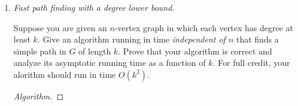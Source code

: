 \documentclass[11pt]{article}
\newcounter{totalpoints}
\newcommand{\points}[1]{\addtocounter{totalpoints}{#1}{[#1 point\ifthenelse{\equal{#1}{1}}{}{s}]}}
\begin{document}
\begin{enumerate}[leftmargin=*,start=0]
\begin{proof}[Solution]
First, since there are 4 students, there are only 3 possible ways to make 2 pairs. 

1) Suppose A and B are paired. Therefore, C and D are paired. However, B would rather be with C than A and 
C would rather be with B than D.

2) Suppose A and C are paired. Therefore, B and D are paired. However, A would rather be with B than C and
B would rather be with A than D.

3) Suppose A and D are paired. Therefore, B and C are paired. However, A would rather be with C than 
D and C would rather be with A than B. 

Therefore, no stable matching exists for this instance with $n=2$.
\end{proof}
\newpage

\item \emph{Fast path finding with a degree lower bound.} \points{20}

Suppose you are given an $n$-vertex graph in which each vertex has degree at least $k$. Give an algorithm running in time \emph{independent of $n$} that finds a simple path in $G$ of length $k$. Prove that your algorithm is correct and analyze its asymptotic running time as a function of $k$. For full credit, your alorithm should run in time $O(k^2)$.

\begin{proof}[Algorithm]

  \hfill


\end{proof}
\end{enumerate}
\end{document}
